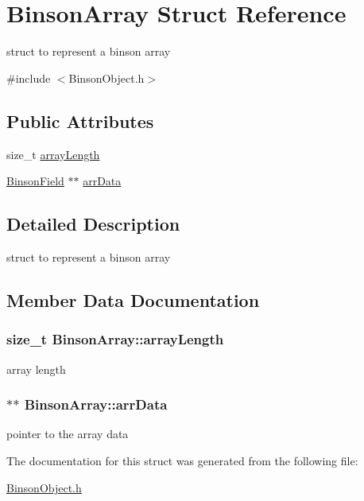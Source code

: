 \hypertarget{structBinsonArray}{\section{Binson\-Array Struct Reference}
\label{structBinsonArray}
}


struct to represent a binson array  




{\ttfamily \#include $<$Binson\-Object.\-h$>$}

\subsection*{Public Attributes}
\begin{DoxyCompactItemize}
\item 
size\-\_\-t \hyperlink{structBinsonArray_a1a59f87f54faf3900bfd338cd1484bd7}{array\-Length}
\item 
\hyperlink{structBinsonField}{Binson\-Field} $\ast$$\ast$ \hyperlink{structBinsonArray_a839f85f7b7039a6329380f09a6262555}{arr\-Data}
\end{DoxyCompactItemize}


\subsection{Detailed Description}
struct to represent a binson array 

\subsection{Member Data Documentation}
\hypertarget{structBinsonArray_a1a59f87f54faf3900bfd338cd1484bd7}{
\subsubsection[{array\-Length}]{\setlength{\rightskip}{0pt plus 5cm}size\-\_\-t Binson\-Array\-::array\-Length}}\label{structBinsonArray_a1a59f87f54faf3900bfd338cd1484bd7}
array length \hypertarget{structBinsonArray_a839f85f7b7039a6329380f09a6262555}{
\subsubsection[{arr\-Data}]{$\ast$$\ast$ Binson\-Array\-::arr\-Data}}\label{structBinsonArray_a839f85f7b7039a6329380f09a6262555}
pointer to the array data 

The documentation for this struct was generated from the following file\-:\begin{DoxyCompactItemize}
\item 
\hyperlink{BinsonObject_8h}{Binson\-Object.\-h}\end{DoxyCompactItemize}
